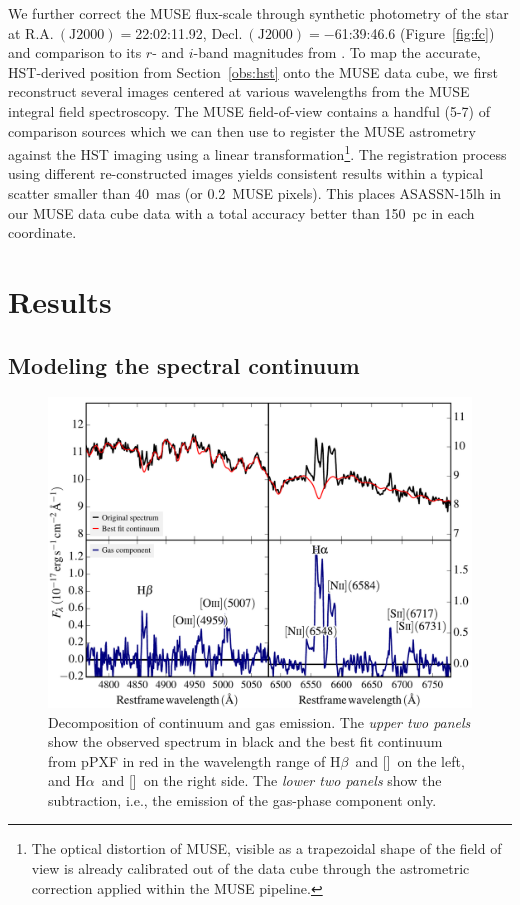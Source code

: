 \documentclass[traditabstract]{aa}
\newcommand{\hb}{H$\beta$}
\newcommand{\ha}{H$\alpha$}
\newcommand{\oiii}{[\ion{O}{iii}]}
\newcommand{\nii}{[\ion{N}{ii}]}
\begin{document}
We further correct the MUSE flux-scale through synthetic photometry of the star at $\mathrm{R.A.~(J2000)}=$22:02:11.92, $\mathrm{Decl.~(J2000)} = -$61:39:46.6 (Figure~\ref{fig:fc}) and comparison to its $r$- and $i$-band magnitudes from \citet{2016NatAs...1E...2L}. To map the accurate, HST-derived position from Section~\ref{obs:hst} onto the MUSE data cube, we first reconstruct several images centered at various wavelengths from the MUSE integral field spectroscopy. The MUSE field-of-view contains a handful (5-7) of comparison sources which we can then use to register the MUSE astrometry against the HST imaging using a linear transformation\footnote{The optical distortion of MUSE, visible as a trapezoidal shape of the field of view is already calibrated out of the data cube through the astrometric correction applied within the MUSE pipeline.}. The registration process using different re-constructed images yields consistent results within a typical scatter smaller than 40~mas (or 0.2~MUSE pixels). This places ASASSN-15lh in our MUSE data cube data with a total accuracy better than 150~pc in each coordinate.

\section{Results}
\label{sec:Res}

\subsection{Modeling the spectral continuum}
\label{sec:pPXF}

\begin{figure}
  \includegraphics[width=0.999\linewidth]{fig/MUSE_stargas.pdf}
\caption{Decomposition of continuum and gas emission. The \textit{upper two panels} show the observed spectrum in black and the best fit continuum from pPXF in red in the wavelength range of \hb~and \oiii~on the left, and \ha~and \nii~on the right side. The \textit{lower two panels} show the subtraction, i.e., the emission of the gas-phase component only.}
\label{fig:stargas}
\end{figure}
\end{document}

